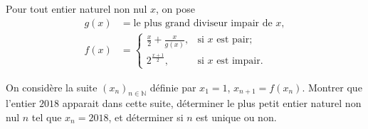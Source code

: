 \documentclass[varwidth]{standalone}
\begin{document}
    Pour tout entier naturel non nul $x$, on pose
    \begin{align*}
        g(x) & = \text{le plus grand diviseur impair de } x, \\
        f(x) & = \begin{cases}
            \frac{x}{2} + \frac{x}{g(x)}, & \text{si } x \text{ est pair;}\\
            2^{\frac{x + 1}{2}}, & \text{si } x \text{ est impair}.
        \end{cases}
    \end{align*}

    On consid\`ere la suite $(x_n)_{n \in \mathbb{N}}$ d\'efinie par $x_1 = 1$, $x_{n + 1} = f(x_n)$. Montrer que l'entier $2018$ apparait dans cette suite, d\'eterminer le plus petit entier naturel non nul $n$ tel que $x_n = 2018$, et d\'eterminer si $n$ est unique ou non.
\end{document}
